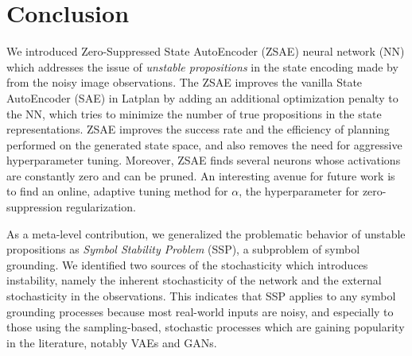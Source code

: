 




\section{Conclusion}
\label{conclusion}

We introduced Zero-Suppressed State AutoEncoder (ZSAE) neural network (NN) which addresses
the issue of \emph{unstable propositions} in the state encoding made by
\latentplanner \cite{Asai2018} from the noisy image observations.
% 
The ZSAE improves the vanilla State AutoEncoder (SAE) in Latplan by
adding an additional optimization penalty to the NN,
which tries to minimize the number of true propositions in the state representations.
% 
ZSAE improves the success rate and the efficiency of planning performed on
the generated state space, and also removes the need for aggressive hyperparameter tuning.
% 
Moreover, 
ZSAE finds several neurons whose activations are constantly zero
and can be pruned.
An interesting avenue for future work is to 
find an online, adaptive tuning method for $\alpha$, the hyperparameter for
zero-suppression regularization.

As a meta-level contribution,
we generalized the problematic behavior of unstable propositions
as \emph{Symbol Stability Problem} (SSP), a subproblem of symbol grounding.
% 
We identified two sources of the stochasticity which introduces instability,
namely
the inherent stochasticity of the network and
the external stochasticity in the observations.
% 
This indicates that
SSP applies to any symbol grounding processes because most real-world inputs are noisy,
and especially to those using the sampling-based, stochastic processes
which are gaining popularity in the literature, notably VAEs and GANs.

